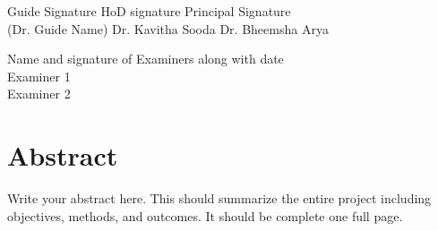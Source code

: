 \documentclass[12pt,a4paper]{report}
\begin{document}
\vspace{2cm}
\begin{flushleft}
Guide Signature\hspace{30mm} HoD signature \hspace{25mm} Principal Signature\\
(Dr. Guide Name) \hspace{25mm} Dr. Kavitha Sooda \hspace{19mm} Dr. Bheemsha Arya 
\end{flushleft}
\vspace{2cm}
\begin{flushleft}
Name and signature of Examiners along with date \\
\vspace {1cm}
Examiner 1 \\
\vspace {1cm}
Examiner 2 \\
    
\end{flushleft}



\chapter*{Abstract}
\thispagestyle{empty}
Write your abstract here. This should summarize the entire project including objectives, methods, and outcomes. It should be complete one full page.
\end{document}
